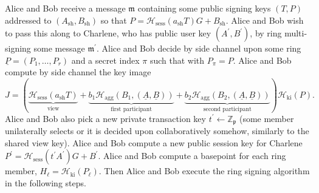 \documentclass{mrl}
\theoremstyle{definition}
\numberwithin{theorem}{subsection}
\newcommand{\scalarField}{\mathbb{Z}_{\mathfrak{p}}}
\newcommand{\m}{\mathfrak{m}}
\begin{document}
Alice and Bob receive a message $\m$ containing some public signing keys $(T,P)$ addressed to $(A_{\text{sh}},B_{\text{sh}})$ so that $P = \mathcal{H}_{\text{sess}}(a_{\text{sh}} T)G + B_{\text{sh}}$.  Alice and Bob wish to pass this along to Charlene, who has public user key $(A^\prime, B^\prime)$, by ring multi-signing some message $\m^\prime$. Alice and Bob decide by side channel upon some ring $\underline{P} = (P_1, \ldots, P_r)$ and a secret index $\pi$ such that with $P_\pi = P$. Alice and Bob compute by side channel the key image 
\[J = \left(\underbrace{\mathcal{H}_{\text{sess}}(a_{\text{sh}} T)}_{\text{view}} + \underbrace{b_1\mathcal{H}_{\text{agg}}(B_1, (\underline{A}, \underline{B}))}_{\text{first participant}} + \underbrace{b_2\mathcal{H}_{\text{agg}}(B_2, (\underline{A}, \underline{B}))}_{\text{second participant}}\right)\mathcal{H}_{\text{ki}}(P).\] Alice and Bob also pick a new private transaction key $t^{\prime} \leftarrow \scalarField$ (some member unilaterally selects or it is decided upon collaboratively somehow, similarly to the shared view key). Alice and Bob compute a new public session key for Charlene $P^{\prime} = \mathcal{H}_{\text{sess}}(t^{\prime} A^{\prime})G + B^\prime$.  Alice and Bob compute a basepoint for each ring member, $H_\ell = \mathcal{H}_{\text{ki}}(P_\ell)$. Then Alice and Bob execute the ring signing algorithm in the following steps.
\end{document}
